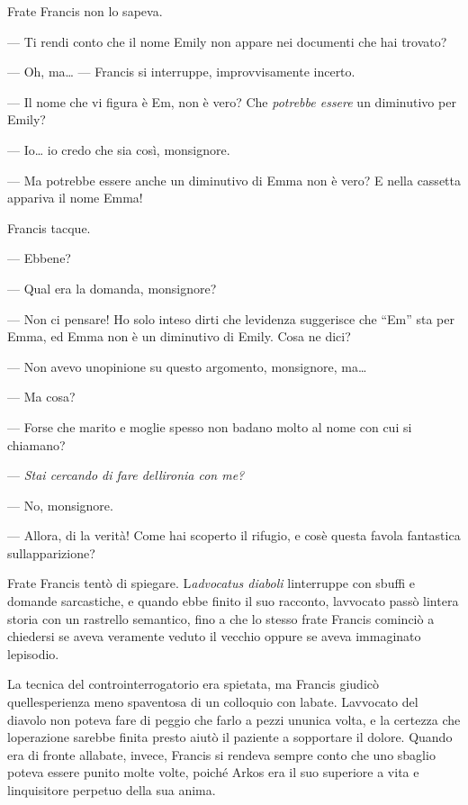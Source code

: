Frate Francis non lo sapeva.

--- Ti rendi conto che il nome Emily non appare nei documenti che hai
trovato?

--- Oh, ma\ldots{} --- Francis si interruppe, improvvisamente incerto.

--- Il nome che vi figura è Em, non è vero? Che \emph{potrebbe essere}
un diminutivo per Emily?

--- Io\ldots{} io credo che sia così, monsignore.

--- Ma potrebbe essere anche un diminutivo di Emma non è vero? E nella
cassetta appariva il nome Emma!

Francis tacque.

--- Ebbene?

--- Qual era la domanda, monsignore?

--- Non ci pensare! Ho solo inteso dirti che l\textquotesingle evidenza
suggerisce che ``Em'' sta per Emma, ed Emma non è un diminutivo di
Emily. Cosa ne dici?

--- Non avevo un\textquotesingle opinione su questo argomento,
monsignore, ma\ldots{}

--- Ma cosa?

--- Forse che marito e moglie spesso non badano molto al nome con cui si
chiamano?

--- \emph{Stai cercando di fare dell\textquotesingle ironia con me?}

--- No, monsignore.

--- Allora, di\textquotesingle{} la verità! Come hai scoperto il
rifugio, e cos\textquotesingle è questa favola fantastica
sull\textquotesingle apparizione?

Frate Francis tentò di spiegare. L\textquotesingle{}\emph{advocatus
	diaboli} l\textquotesingle interruppe con sbuffi e domande sarcastiche,
e quando ebbe finito il suo racconto, l\textquotesingle avvocato passò
l\textquotesingle intera storia con un rastrello semantico, fino a che
lo stesso frate Francis cominciò a chiedersi se aveva veramente veduto
il vecchio oppure se aveva immaginato l\textquotesingle episodio.

La tecnica del controinterrogatorio era spietata, ma Francis giudicò
quell\textquotesingle esperienza meno spaventosa di un colloquio con
l\textquotesingle abate. L\textquotesingle avvocato del diavolo non
poteva fare di peggio che farlo a pezzi un\textquotesingle unica volta,
e la certezza che l\textquotesingle operazione sarebbe finita presto
aiutò il paziente a sopportare il dolore. Quando era di fronte
all\textquotesingle abate, invece, Francis si rendeva sempre conto che
uno sbaglio poteva essere punito molte volte, poiché Arkos era il suo
superiore a vita e l\textquotesingle inquisitore perpetuo della sua
anima.

